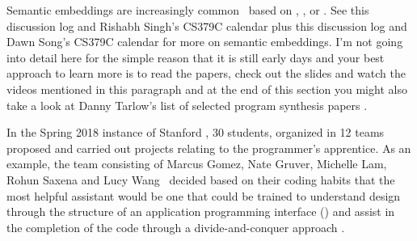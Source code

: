 Semantic embeddings are increasingly common~\cite{DevlinetalICLR-18,ChistyakovetalICLR-17,WangetalCoRR-17,XuetalCoRR-17,PiechetalICML-15} based on {}, {}, or {}. See this discussion log {} and Rishabh Singh's CS379C calendar {} plus this discussion log {} and Dawn Song's CS379C calendar {} for more on semantic embeddings. I'm not going into detail here for the simple reason that it is still early days and your best approach to learn more is to read the papers, check out the slides and watch the videos mentioned in this paragraph and at the end of this section \emdash{} you might also take a look at Danny Tarlow's list of selected program synthesis papers {}.




In the Spring 2018 instance of Stanford {}, 30 students, organized in 12 teams proposed and carried out projects relating to the programmer's apprentice. As an example, the team consisting of Marcus Gomez, Nate Gruver, Michelle Lam, Rohun Saxena and Lucy Wang~\cite{CS379C_Final_Project_Gomezetal-18} decided based on their coding habits that the most helpful assistant would be one that could be trained to understand design through the structure of an application programming interface ({}) and assist in the completion of the code through a divide-and-conquer approach {}.

